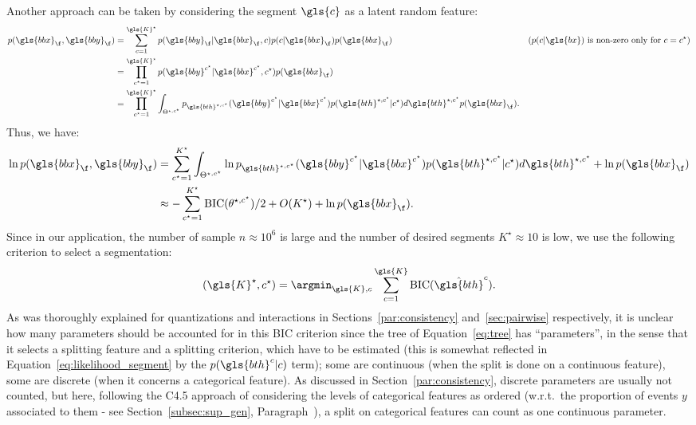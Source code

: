 Another approach can be taken by considering the segment $\gls{c}$ as a latent random feature:
\begin{align}
p(\gls{bbx}_\f,\gls{bby}_\f) & =  \sum_{c=1}^{\gls{K}^\star} p(\gls{bby}_\f | \gls{bbx}_\f, c) p(c | \gls{bbx}_\f) p(\gls{bbx}_\f) & \text{($p(c | \gls{bx})$ is non-zero only for $c = c^\star$)} \nonumber \\
 & = \prod_{c^\star=1}^{\gls{K}^\star} p(\gls{bby}^{c^\star} | \gls{bbx}^{c^\star}, c^\star) p(\gls{bbx}_\f) \nonumber \\
 & = \prod_{c^\star=1}^{\gls{K}^\star} \int_{\Theta^{\star,c^\star}} p_{\gls{bth}^{\star, c^\star}}(\gls{bby}^{c^\star} | \gls{bbx}^{c^\star}) p(\gls{bth}^{\star, c^\star} | c^\star) d\gls{bth}^{\star, c^\star} p(\gls{bbx}_\f). \label{eq:likelihood_segment}
\end{align}
Thus, we have:
\begin{align*}
\ln p(\gls{bbx}_\f,\gls{bby}_\f) & =  \sum_{c^\star = 1}^{K^\star} \int_{\Theta^{\star,c^\star}} \ln p_{\gls{bth}^{\star, c^\star}}(\gls{bby}^{c^\star} | \gls{bbx}^{c^\star}) p(\gls{bth}^{\star, c^\star} | c^\star) d\gls{bth}^{\star, c^\star} + \ln p(\gls{bbx}_\f) \\
& \approx - \sum_{c^\star=1}^{K^\star} \text{BIC}(\theta^{\star,c^\star})/2 + O(K^\star) + \ln p(\gls{bbx}_\f).
\end{align*}
Since in our application, the number of sample $n \approx 10^6$ is large and the number of desired segments $K^\star \approx 10$ is low, we use the following criterion to select a segmentation:
\begin{equation} \label{eq:BICc}
(\gls{K}^\star, c^\star) = \argmin_{\gls{K},c} \sum_{c=1}^{\gls{K}} \text{BIC}(\hat{\gls{bth}}^c).
\end{equation}
As was thoroughly explained for quantizations and interactions in Sections~\ref{par:consistency} and~\ref{sec:pairwise} respectively, it is unclear how many parameters should be accounted for in this BIC criterion since the tree of Equation~\eqref{eq:tree} has ``parameters'', in the sense that it selects a splitting feature and a splitting criterion, 
which have to be estimated (this is somewhat reflected in Equation~\eqref{eq:likelihood_segment} by the $p(\gls{bth}^c | c)$ term); some are continuous (when the split is done on a continuous feature), some are discrete (when it concerns a categorical feature). As discussed in Section~\ref{par:consistency}, discrete parameters are usually not counted, but here, following the C4.5 approach of considering the levels of categorical features as ordered (w.r.t.\ the proportion of events $y$ associated to them - see Section~\ref{subsec:sup_gen}, Paragraph~), a split on categorical features can count as one continuous parameter.
